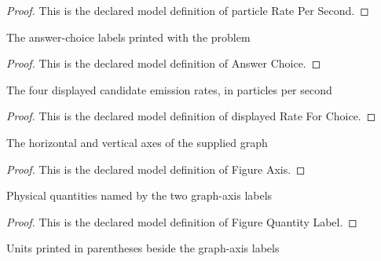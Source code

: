 \begin{proof}
  This is the declared model definition of particle Rate Per Second.
\end{proof}
\begin{definition}
  \label{def:physics:phyx-mini-0642:phyxminiproblems-problemphyxmini0642-answerchoice}
  The answer-choice labels printed with the problem
\end{definition}
\begin{proof}
  This is the declared model definition of Answer Choice.
\end{proof}
\begin{definition}
  \label{def:physics:phyx-mini-0642:phyxminiproblems-problemphyxmini0642-displayedrateforchoice}
  The four displayed candidate emission rates, in particles per second
\end{definition}
\begin{proof}
  This is the declared model definition of displayed Rate For Choice.
\end{proof}
\begin{definition}
  \label{def:physics:phyx-mini-0642:phyxminiproblems-problemphyxmini0642-figureaxis}
  The horizontal and vertical axes of the supplied graph
\end{definition}
\begin{proof}
  This is the declared model definition of Figure Axis.
\end{proof}
\begin{definition}
  \label{def:physics:phyx-mini-0642:phyxminiproblems-problemphyxmini0642-figurequantitylabel}
  Physical quantities named by the two graph-axis labels
\end{definition}
\begin{proof}
  This is the declared model definition of Figure Quantity Label.
\end{proof}
\begin{definition}
  \label{def:physics:phyx-mini-0642:phyxminiproblems-problemphyxmini0642-figureunitlabel}
  Units printed in parentheses beside the graph-axis labels
\end{definition}
